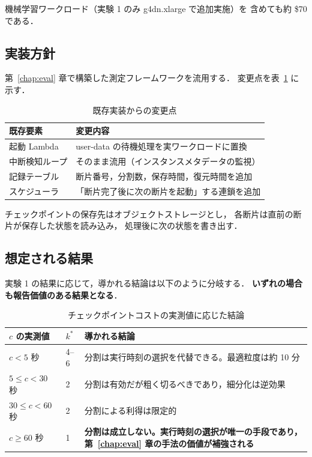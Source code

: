 \documentclass[11pt,a4paper]{ltjsreport}
\begin{document}
機械学習ワークロード（実験 1 のみ g4dn.xlarge で追加実施）を
含めても約 \$70 である．

\subsection{実装方針}

第~\ref{chap:eval} 章で構築した測定フレームワークを流用する．
変更点を表~\ref{tab:impl} に示す．

\begin{table}[htbp]
\centering
\caption{既存実装からの変更点}
\label{tab:impl}
\small
\begin{tabularx}{\textwidth}{@{}lX@{}}
\toprule
既存要素 & 変更内容 \\
\midrule
起動 Lambda & user-data の待機処理を実ワークロードに置換 \\
中断検知ループ & そのまま流用（インスタンスメタデータの監視） \\
記録テーブル & 断片番号，分割数，保存時間，復元時間を追加 \\
スケジューラ & 「断片完了後に次の断片を起動」する連鎖を追加 \\
\bottomrule
\end{tabularx}
\end{table}

チェックポイントの保存先はオブジェクトストレージとし，
各断片は直前の断片が保存した状態を読み込み，
処理後に次の状態を書き出す．

\subsection{想定される結果}

実験 1 の結果に応じて，導かれる結論は以下のように分岐する．
\textbf{いずれの場合も報告価値のある結果となる}．

\begin{table}[htbp]
\centering
\caption{チェックポイントコストの実測値に応じた結論}
\label{tab:outcomes}
\small
\begin{tabularx}{\textwidth}{@{}llX@{}}
\toprule
$c$ の実測値 & $k^{*}$ & 導かれる結論 \\
\midrule
$c < 5$ 秒 & 4--6
  & 分割は実行時刻の選択を代替できる。最適粒度は約 10 分 \\
\addlinespace
$5 \leq c < 30$ 秒 & 2
  & 分割は有効だが粗く切るべきであり，細分化は逆効果 \\
\addlinespace
$30 \leq c < 60$ 秒 & 2
  & 分割による利得は限定的 \\
\addlinespace
$c \geq 60$ 秒 & 1
  & \textbf{分割は成立しない。実行時刻の選択が唯一の手段であり，
    第~\ref{chap:eval} 章の手法の価値が補強される} \\
\bottomrule
\end{tabularx}
\end{table}
\end{document}
